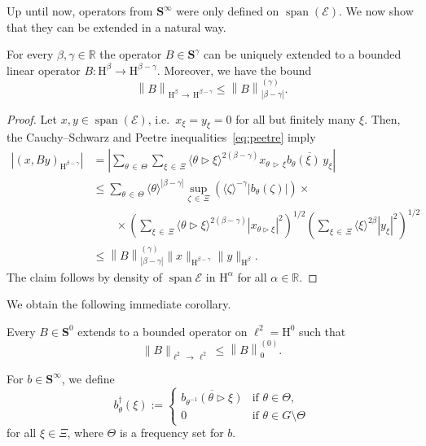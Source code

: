 \documentclass[AHL,Unicode,longabstracts,published]{cedram}
\DeclareMathOperator{\spann}{span}
\renewcommand{\mathsf}{\mathrm}
\newcommand{\sfH}{\mathsf{H}}
\newcommand{\R}{\mathbb R}
\newcommand{\CE}{\mathcal{E}}
\newcommand{\BS}{\mathbf S}
\newcommand{\act}{\triangleright}
\newcommand{\abs}[1]{\left\lvert #1 \right\rvert}
\newcommand{\norm}[1]{\left\| #1 \right\|}
\newcommand{\snorm}[3]{\left\| #1\right\|_{#3}^{(#2)}}
\newcommand{\ang}[1]{\langle #1 \rangle}
\begin{document}
Up until now, operators from $\BS^\infty$ were only defined on $\spann(\CE)$. We now show that they can be extended in a natural way.
\begin{lemm} \label{lem:domain}
For every $\beta,\gamma\in\R$ the operator $B \in \BS^\gamma$ can be uniquely extended to a bounded linear operator $B : \sfH^{\beta} \to \sfH^{\beta-\gamma}$. Moreover, we have the bound
\begin{equation}
\norm{B}_{\sfH^{\beta}\,\to\,\sfH^{\beta-\gamma}}
\le \snorm{B}{\gamma}{\abs{\beta-\gamma}}.
\end{equation}
\end{lemm}
\begin{proof}
Let $x,y \in \spann(\CE)$, i.e.~$x_\xi=y_\xi=0$ for all but finitely many $\xi$. Then, the Cauchy--Schwarz and Peetre inequalities~\eqref{eq:peetre} imply
\begin{equation}
\begin{aligned}
\left|(x,By)_{\sfH^{\beta-\gamma}} \right|& = \abs{\sum_{\theta\,\in\,\Theta} \sum_{\xi\,\in\,\Xi}
\ang{\theta\act\xi}^{2(\beta - \gamma)} x_{\theta\,\act\,\xi} \overline{ b_\theta(\xi)\,y_\xi}}
\\
&\le \sum_{\theta\,\in\,\Theta} \ang \theta^{\abs{\beta-\gamma}}
\sup_{\zeta\,\in\,\Xi} \left(\ang{\zeta}^{-\gamma}\abs{b_\theta(\zeta)}\right) \times \\
& \qquad \times \left(\sum_{\xi\,\in\,\Xi}\ang{\theta \act \xi}^{2(\beta-\gamma)}
\abs{x_{\theta\act\xi}}^2\right)^{1/2}
\left(\sum_{\xi\,\in\,\Xi} \ang \xi^{2\beta} \abs{ y_\xi}^2\right)^{1/2}\\
&\leq \snorm{B}{\gamma}{\abs{\beta-\gamma}} \|x\|_{\sfH^{\beta-\gamma} } \|y\|_{\sfH^{\beta}}.
\end{aligned}
\end{equation}
The claim follows by density of $\spann\CE$ in $\sfH^{\alpha}$ for all $\alpha\in\R$.
\end{proof}

We obtain the following immediate corollary.

\begin{coro} \label{cor:domain}
Every $B \in \BS^0$ extends to a bounded operator on $\ell^2 =\sfH^0$ such that
\begin{equation}
\|B\|_{\ell^2\,\to\,\ell^2} \le \snorm{B}{0}{0}.
\end{equation}
\end{coro}

\begin{defi}
For $b\in\BS^\infty$, we define
\begin{equation}\label{eq:adjoint symbol}
b^\dagger_\theta(\xi):=
\begin{cases}\overline{b_{\theta^{-1}}(\theta\act\xi)}&
\text{if } \theta\in \Theta,\\
0& \text{if }\theta\in G\setminus\Theta
\end{cases}
\end{equation}
for all $\xi\in\Xi$, where $\Theta$ is a frequency set for $b$.
\end{defi}
\end{document}
